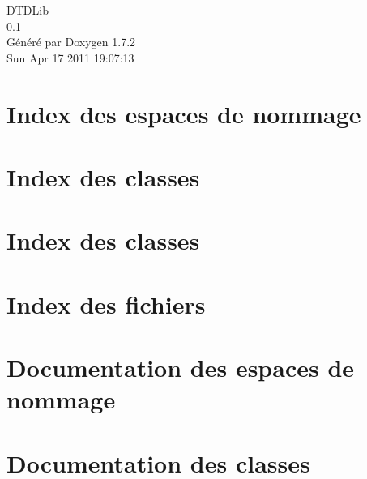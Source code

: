 \documentclass[a4paper]{book}
\begin{document}
\hypersetup{pageanchor=false}
\begin{titlepage}
\vspace*{7cm}
\begin{center}
{\Large DTDLib \\[1ex]\large 0.1 }\\
\vspace*{1cm}
{\large Généré par Doxygen 1.7.2}\\
\vspace*{0.5cm}
{\small Sun Apr 17 2011 19:07:13}\\
\end{center}
\end{titlepage}
\clearemptydoublepage
{}
\tableofcontents
\clearemptydoublepage
{}
\hypersetup{pageanchor=true}
\chapter{Index des espaces de nommage}

\chapter{Index des classes}

\chapter{Index des classes}

\chapter{Index des fichiers}

\chapter{Documentation des espaces de nommage}

\chapter{Documentation des classes}























\end{document}
